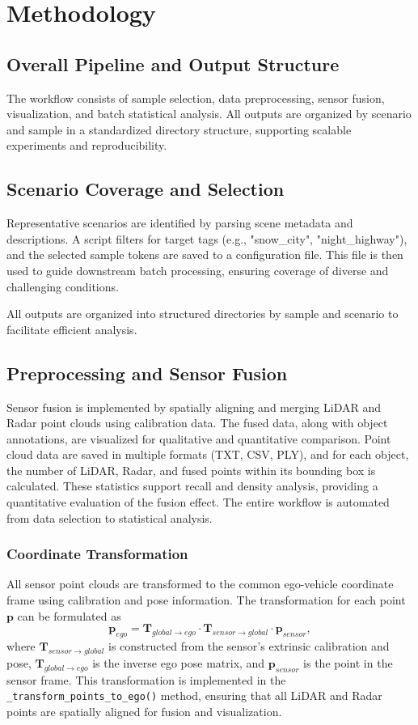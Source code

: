 \documentclass[10pt, a4paper, oneside]{article}
\begin{document}
\section{Methodology}

\subsection{Overall Pipeline and Output Structure}
The workflow consists of sample selection, data preprocessing, sensor fusion, visualization, and batch statistical analysis. All outputs are organized by scenario and sample in a standardized directory structure, supporting scalable experiments and reproducibility.
\subsection{Scenario Coverage and Selection}
Representative scenarios are identified by parsing scene metadata and descriptions. A script filters for target tags (e.g., "snow\_city", "night\_highway"), and the selected sample tokens are saved to a configuration file. This file is then used to guide downstream batch processing, ensuring coverage of diverse and challenging conditions.

All outputs are organized into structured directories by sample and scenario to facilitate efficient analysis.
\subsection{Preprocessing and Sensor Fusion}
Sensor fusion is implemented by spatially aligning and merging LiDAR and Radar point clouds using calibration data. The fused data, along with object annotations, are visualized for qualitative and quantitative comparison. Point cloud data are saved in multiple formats (TXT, CSV, PLY), and for each object, the number of LiDAR, Radar, and fused points within its bounding box is calculated. These statistics support recall and density analysis, providing a quantitative evaluation of the fusion effect. The entire workflow is automated from data selection to statistical analysis.
	\subsubsection{Coordinate Transformation}
All sensor point clouds are transformed to the common ego-vehicle coordinate frame using calibration and pose information. The transformation for each point $\mathbf{p}$ can be formulated as
\begin{equation}
\mathbf{p}_{ego} = \mathbf{T}_{global \rightarrow ego} \cdot \mathbf{T}_{sensor \rightarrow global} \cdot \mathbf{p}_{sensor},
\end{equation}
where $\mathbf{T}_{sensor \rightarrow global}$ is constructed from the sensor's extrinsic calibration and pose, $\mathbf{T}_{global \rightarrow ego}$ is the inverse ego pose matrix, and $\mathbf{p}_{sensor}$ is the point in the sensor frame. This transformation is implemented in the \texttt{\_transform\_points\_to\_ego()} method, ensuring that all LiDAR and Radar points are spatially aligned for fusion and visualization.
\end{document}
